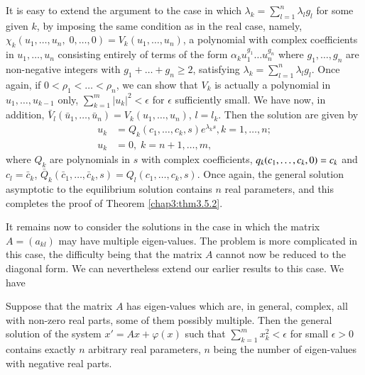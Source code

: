 It is easy to extend the argument to the case in which $\lambda_k =
\sum\limits^n_{l=1} \lambda_l g_l$ for some given $k$, by imposing the
same condition as in the real case, namely, $\chi_k (u_1, \ldots, u_n,
\; 0, \ldots, 0) = V_k (u_1, \ldots, u_n)$, a polynomial with complex
coefficients in $u_1, \ldots, u_n$ consisting entirely of terms of the
form $\alpha_k u^{g_1}_1 \ldots u^{g_n}_n$ where $g_1, \ldots, g_n$
are non-negative integers with $g_1 + \ldots + g_n\geq 2$, satisfying
$\lambda_k = \sum\limits^n_{l=1} \lambda_l g_l$. Once again, if $0
<\rho_1 < \ldots < \rho_n$, we can show that $V_k$ is actually a
polynomial in $u_1, \ldots, u_{k-1}$ only, $\sum\limits^m_{k=1}
|u_k|^2 < \epsilon$ for $\epsilon$ sufficiently small.\pageoriginale
We have now, in addition, $\bar{V}_l(\bar{u}_1, \ldots, \bar{u}_n) =
V_k (u_1, \ldots, u_n)$, $l=l_k$.  Then the solution are given by  
\begin{align*}
u_k & = Q_k (c_1, \ldots, c_k, s) e^{\lambda_k s}, k =1, \ldots, n;\\
u_k & = 0, \; k = n+1, \ldots, m,
\end{align*}
where $Q_k$ are polynomials in $s$ with complex coefficients,
$q_k(c_1, \ldots,\break c_k,0) = c_k$ and $c_l = \bar{c}_k$, $\bar{Q}_k
(\bar{c}_1, \ldots, \bar{c}_k, s) = Q_l (c_1, \ldots, c_k, s)$. Once
again, the general solution asymptotic to the equilibrium solution
contains $n$ real parameters, and this completes the proof of Theorem
\ref{chap3:thm3.5.2}. 

It remains now to consider the solutions in the case in which the
matrix $A = (a_{kl})$ may have multiple eigen-values. The problem is
more complicated in this case, the difficulty being that the matrix
$A$ cannot now be reduced to the diagonal form. We can nevertheless
extend our earlier results to this case. We have  

\begin{subtheorem}\label{chap3:thm3.5.3}
Suppose that the matrix $A$ has eigen-values which are, in general,
complex, all with non-zero real parts, some of them possibly
multiple. Then the general solution of the system $x' = Ax + \varphi
(x)$ such that $\sum\limits^m_{k=1} x^2_k < \epsilon$ for small
$\epsilon > 0$ contains exactly $n$ arbitrary real parameters, $n$
being the number of eigen-values with negative real parts. 
\end{subtheorem}


